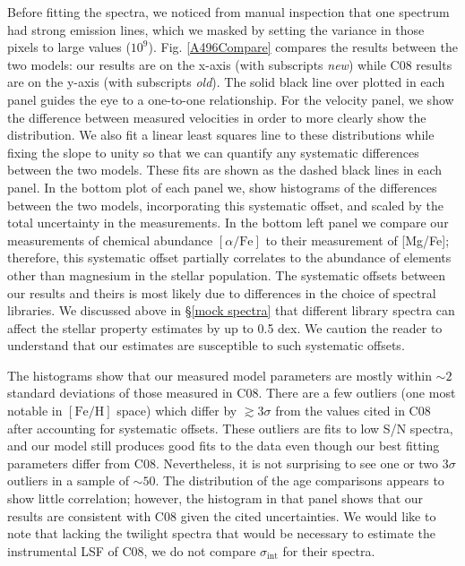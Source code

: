 \documentclass[twocolumn]{aastex6}
\def\feh{\mathrm{[Fe/H]}}
\def\afe{[\alpha/\mathrm{Fe}]}
\def\disp{\sigma_\mathrm{int}}
\begin{document}
Before fitting the spectra, we noticed from manual inspection that one spectrum had strong emission lines, which we masked by setting the variance in those pixels to large values ($10^9$).
Fig. \ref{A496Compare} compares the results between the two models: our results are on the x-axis (with subscripts \textit{new}) while C08 results are on the y-axis (with subscripts \textit{old}).
The solid black line over plotted in each panel guides the eye to a one-to-one relationship.
For the velocity panel, we show the difference between measured velocities in order to more clearly show the distribution.
We also fit a linear least squares line to these distributions while fixing the slope to unity so that we can quantify any systematic differences between the two models.
These fits are shown as the dashed black lines in each panel.
In the bottom plot of each panel we, show histograms of the differences between the two models, incorporating this systematic offset, and scaled by the total uncertainty in the measurements.
In the bottom left panel we compare our measurements of chemical abundance $\afe$ to their measurement of [Mg/Fe]; therefore, this systematic offset partially correlates to the abundance of elements other than magnesium in the stellar population.
The systematic offsets between our results and theirs is most likely due to differences in the choice of spectral libraries.
We discussed above in \S\ref{mock spectra} that different library spectra can affect the stellar property estimates by up to 0.5 dex.
We caution the reader to understand that our estimates are susceptible to such systematic offsets.

The histograms show that our measured model parameters are mostly within $\sim2$ standard deviations of those measured in C08.
There are a few outliers (one most notable in $\feh$ space) which differ by $\gtrsim3\sigma$ from the values cited in C08 after accounting for systematic offsets.
These outliers are fits to low S/N spectra, and our model still produces good fits to the data even though our best fitting parameters differ from C08.
Nevertheless, it is not surprising to see one or two $3\sigma$ outliers in a sample of $\sim50$.
The distribution of the age comparisons appears to show little correlation; however, the histogram in that panel shows that our results are consistent with C08 given the cited uncertainties.
We would like to note that lacking the twilight spectra that would be necessary to estimate the instrumental LSF of C08, we do not compare $\disp$ for their spectra.
\end{document}
